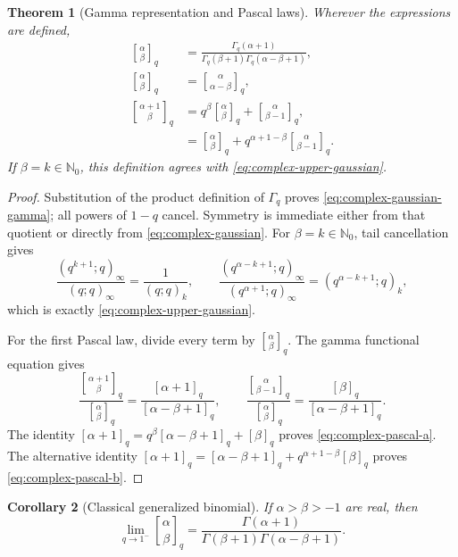 \documentclass[11pt,oneside,openany]{book}
\newtheorem{theorem}{Theorem}[chapter]
\newtheorem{corollary}[theorem]{Corollary}
\theoremstyle{definition}
\theoremstyle{remark}
\newcommand{\N}{\mathbb N}
\begin{document}
\begin{theorem}[Gamma representation and Pascal laws]\label{thm:complex-gaussian-properties}
Wherever the expressions are defined,
\begin{align}
 \genfrac{[}{]}{0pt}{}{\alpha}{\beta}_q
 &=\frac{\Gamma_q(\alpha+1)}
 {\Gamma_q(\beta+1)\Gamma_q(\alpha-\beta+1)},
 \tag{17.9}\label{eq:complex-gaussian-gamma}\\
 \genfrac{[}{]}{0pt}{}{\alpha}{\beta}_q
 &=\genfrac{[}{]}{0pt}{}{\alpha}{\alpha-\beta}_q,
 \tag{17.10}\label{eq:complex-gaussian-symmetry}\\
 \genfrac{[}{]}{0pt}{}{\alpha+1}{\beta}_q
 &=q^\beta\genfrac{[}{]}{0pt}{}{\alpha}{\beta}_q
   +\genfrac{[}{]}{0pt}{}{\alpha}{\beta-1}_q,
 \tag{17.11}\label{eq:complex-pascal-a}\\
 &=\genfrac{[}{]}{0pt}{}{\alpha}{\beta}_q
   +q^{\alpha+1-\beta}
    \genfrac{[}{]}{0pt}{}{\alpha}{\beta-1}_q.
 \tag{17.12}\label{eq:complex-pascal-b}
\end{align}
If $\beta=k\in\N_0$, this definition agrees with \eqref{eq:complex-upper-gaussian}.
\end{theorem}

\begin{proof}
Substitution of the product definition of $\Gamma_q$ proves \eqref{eq:complex-gaussian-gamma}; all powers of $1-q$ cancel.  Symmetry is immediate either from that quotient or directly from \eqref{eq:complex-gaussian}.  For $\beta=k\in\N_0$, tail cancellation gives
\[
 \frac{(q^{k+1};q)_\infty}{(q;q)_\infty}
 =\frac1{(q;q)_k},
 \qquad
 \frac{(q^{\alpha-k+1};q)_\infty}
 {(q^{\alpha+1};q)_\infty}
 =(q^{\alpha-k+1};q)_k,
\]
which is exactly \eqref{eq:complex-upper-gaussian}.

For the first Pascal law, divide every term by
$\genfrac{[}{]}{0pt}{}{\alpha}{\beta}_q$.  The gamma functional equation gives
\[
 \frac{\genfrac{[}{]}{0pt}{}{\alpha+1}{\beta}_q}
      {\genfrac{[}{]}{0pt}{}{\alpha}{\beta}_q}
 =\frac{[\alpha+1]_q}{[\alpha-\beta+1]_q},
 \qquad
 \frac{\genfrac{[}{]}{0pt}{}{\alpha}{\beta-1}_q}
      {\genfrac{[}{]}{0pt}{}{\alpha}{\beta}_q}
 =\frac{[\beta]_q}{[\alpha-\beta+1]_q}.
\]
The identity
\(
 [\alpha+1]_q=q^\beta[\alpha-\beta+1]_q+[\beta]_q
\)
proves \eqref{eq:complex-pascal-a}.  The alternative identity
\(
 [\alpha+1]_q=[\alpha-\beta+1]_q
 +q^{\alpha+1-\beta}[\beta]_q
\)
proves \eqref{eq:complex-pascal-b}.
\end{proof}

\begin{corollary}[Classical generalized binomial]\label{cor:complex-gaussian-classical}
If $\alpha>\beta>-1$ are real, then
\[
 \lim_{q\to1^-}\genfrac{[}{]}{0pt}{}{\alpha}{\beta}_q
 =\frac{\Gamma(\alpha+1)}
 {\Gamma(\beta+1)\Gamma(\alpha-\beta+1)}.
\]
\end{corollary}
\end{document}
